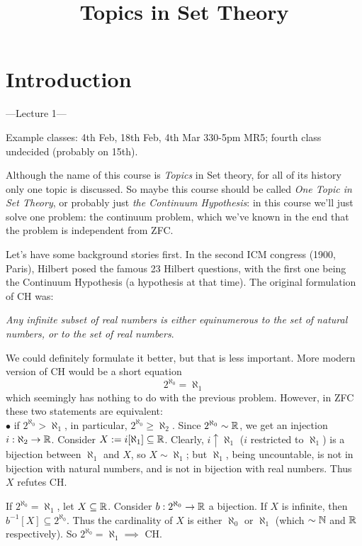 \documentclass[a4paper]{article}
\begin{document}
\title{Topics in Set Theory}

\maketitle

\newpage

\tableofcontents

\newpage

\section{Introduction}

---Lecture 1---

Example classes: 4th Feb, 18th Feb, 4th Mar 330-5pm MR5; fourth class undecided (probably on 15th).

Although the name of this course is \emph{Topics} in Set theory, for all of its history only one topic is discussed. So maybe this course should be called \emph{One Topic in Set Theory}, or probably just \emph{the Continuum Hypothesis}: in this course we'll just solve one problem: the continuum problem, which we've known in the end that the problem is independent from ZFC.

Let's have some background stories first. In the second ICM congress (1900, Paris), Hilbert posed the famous 23 Hilbert questions, with the first one being the Continuum Hypothesis (a hypothesis at that time). The original formulation of CH was:

\emph{Any infinite subset of real numbers is either equinumerous to the set of natural numbers, or to the set of real numbers}.

We could definitely formulate it better, but that is less important. More modern version of CH would be a short equation
$$2^{\aleph_0} = \aleph_1$$
which seemingly has nothing to do with the previous problem. However, in ZFC these two statements are equivalent:\\
$\bullet$ if $2^{\aleph_0} > \aleph_1$, in particular, $2^{\aleph_0} \geq \aleph_2$. Since $2^{\aleph_0} \sim \mathbb{R}$, we get an injection $i:\aleph_2 \to \mathbb{R}$. Consider $X:=i[\aleph_1] \subseteq \mathbb{R}$. Clearly, $i \uparrow \aleph_1$ ($i$ restricted to $\aleph_1$) is a bijection between $\aleph_1$ and $X$, so $X \sim \aleph_1$; but $\aleph_1$, being uncountable, is not in bijection with natural numbers, and is not in bijection with real numbers. Thus $X$ refutes CH.

If $2^{\aleph_0} = \aleph_1$, let $X \subseteq \mathbb{R}$. Consider $b:2^{\aleph_0} \to \mathbb{R}$ a bijection. If $X$ is infinite, then $b^{-1}[X] \subseteq 2^{\aleph_0}$. Thus the cardinality of $X$ is either $\aleph_0$ or $\aleph_1$ (which $\sim \mathbb{N}$ and $\mathbb{R}$ respectively). So $2^{\aleph_0} = \aleph_1 \implies$ CH.
\end{document}
